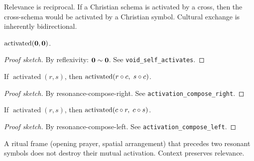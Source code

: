 \begin{remark}
Relevance is reciprocal.  If a Christian schema is activated by a cross,
then the cross-schema would be activated by a Christian symbol.
Cultural exchange is inherently bidirectional.
\end{remark}

\begin{theorem}
\label{thm:void-self-activates}
$\operatorname{activated}(\mathbf{0}, \mathbf{0})$.
\end{theorem}

\begin{proof}[Proof sketch]
By reflexivity: $\mathbf{0} \sim \mathbf{0}$.
See \texttt{void\_self\_activates}.
\end{proof}

\begin{theorem}
\label{thm:activation-compose-right}
If $\operatorname{activated}(r, s)$, then
$\operatorname{activated}(r \circ c,\; s \circ c)$.
\end{theorem}

\begin{proof}[Proof sketch]
By resonance-compose-right.  See \texttt{activation\_compose\_right}.
\end{proof}

\begin{theorem}
\label{thm:activation-compose-left}
If $\operatorname{activated}(r, s)$, then
$\operatorname{activated}(c \circ r,\; c \circ s)$.
\end{theorem}

\begin{proof}[Proof sketch]
By resonance-compose-left.  See \texttt{activation\_compose\_left}.
\end{proof}

\begin{remark}
A ritual frame (opening prayer, spatial arrangement) that precedes two
resonant symbols does not destroy their mutual activation.  Context
preserves relevance.
\end{remark}

